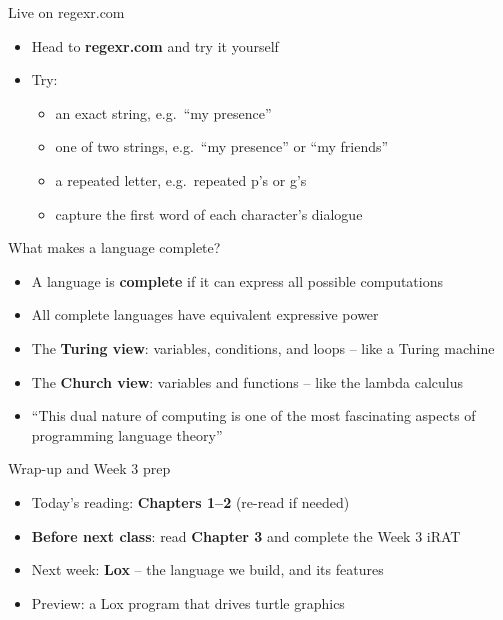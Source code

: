 \documentclass[
  ignorenonframetext,
]{beamer}
\providecommand{\tightlist}{%
  \setlength{\itemsep}{0pt}\setlength{\parskip}{0pt}}
\begin{document}
\begin{frame}{Live on regexr.com}
\label{live-on-regexr.com}
\begin{itemize}
\tightlist
\item
  Head to \textbf{regexr.com} and try it yourself
\item
  Try:

  \begin{itemize}
  \tightlist
  \item
    an exact string, e.g.~``my presence''
  \item
    one of two strings, e.g.~``my presence'' or ``my friends''
  \item
    a repeated letter, e.g.~repeated p's or g's
  \item
    capture the first word of each character's dialogue
  \end{itemize}
\end{itemize}

\end{frame}

\begin{frame}{What makes a language complete?}
\label{what-makes-a-language-complete}
\begin{itemize}
\tightlist
\item
  A language is \textbf{complete} if it can express all possible
  computations
\item
  All complete languages have equivalent expressive power
\item
  The \textbf{Turing view}: variables, conditions, and loops -- like a
  Turing machine
\item
  The \textbf{Church view}: variables and functions -- like the lambda
  calculus
\item
  ``This dual nature of computing is one of the most fascinating aspects
  of programming language theory''
\end{itemize}

\end{frame}

\begin{frame}{Wrap-up and Week 3 prep}
\label{wrap-up-and-week-3-prep}
\begin{itemize}
\tightlist
\item
  Today's reading: \textbf{Chapters 1--2} (re-read if needed)
\item
  \textbf{Before next class}: read \textbf{Chapter 3} and complete the
  Week 3 iRAT
\item
  Next week: \textbf{Lox} -- the language we build, and its features
\item
  Preview: a Lox program that drives turtle graphics
\end{itemize}

\end{frame}
\end{document}
